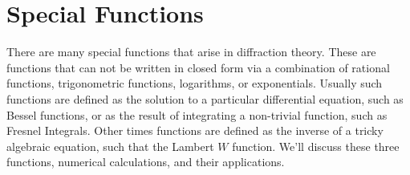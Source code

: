 \chapter{Special Functions}
    There are many special functions that arise in diffraction
    theory. These are functions that can not be written in
    closed form via a combination of rational functions,
    trigonometric functions, logarithms, or exponentials.
    Usually such functions are defined as the solution to
    a particular differential equation, such as Bessel
    functions, or as the result of integrating a non-trivial
    function, such as Fresnel Integrals. Other times functions
    are defined as the inverse of a tricky algebraic equation,
    such that the Lambert $W$ function. We'll discuss these
    three functions, numerical calculations, and their
    applications.
